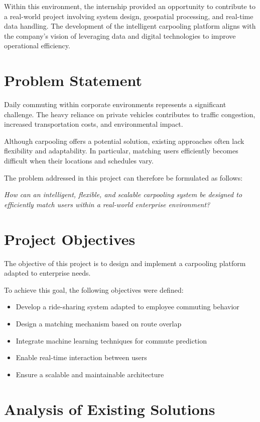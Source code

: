 Within this environment, the internship provided an opportunity to contribute to a real-world project involving system design, geospatial processing, and real-time data handling. The development of the intelligent carpooling platform aligns with the company’s vision of leveraging data and digital technologies to improve operational efficiency.

\section{Problem Statement}

Daily commuting within corporate environments represents a significant challenge. The heavy reliance on private vehicles contributes to traffic congestion, increased transportation costs, and environmental impact.

Although carpooling offers a potential solution, existing approaches often lack flexibility and adaptability. In particular, matching users efficiently becomes difficult when their locations and schedules vary.

The problem addressed in this project can therefore be formulated as follows:

\textit{How can an intelligent, flexible, and scalable carpooling system be designed to efficiently match users within a real-world enterprise environment?}

\section{Project Objectives}

The objective of this project is to design and implement a carpooling platform adapted to enterprise needs.

To achieve this goal, the following objectives were defined:

\begin{itemize}
    \item Develop a ride-sharing system adapted to employee commuting behavior
    \item Design a matching mechanism based on route overlap
    \item Integrate machine learning techniques for commute prediction
    \item Enable real-time interaction between users
    \item Ensure a scalable and maintainable architecture
\end{itemize}

\section{Analysis of Existing Solutions}

